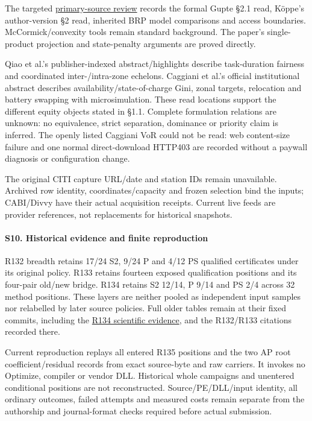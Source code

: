 \documentclass[
  american,
  11pt,
]{article}
\begin{document}
The targeted
\href{https://github.com/yifanXovo/TailoredExact/blob/codex/round172-journal-manuscript/results/unified_exact_round165/literature_review.md}{primary-source
review} records the formal Gupte §2.1 read, Köppe's author-version §2
read, inherited BRP model comparisons and access boundaries.
McCormick/convexity tools remain standard background. The paper's
single-product projection and state-penalty arguments are proved
directly.

Qiao et al.'s publisher-indexed abstract/highlights describe
task-duration fairness and coordinated inter-/intra-zone echelons.
Caggiani et al.'s official institutional abstract describes
availability/state-of-charge Gini, zonal targets, relocation and battery
swapping with microsimulation. These read locations support the
different equity objects stated in §1.1. Complete formulation relations
are unknown: no equivalence, strict separation, dominance or priority
claim is inferred. The openly listed Caggiani VoR could not be read: web
content-size failure and one normal direct-download HTTP403 are recorded
without a paywall diagnosis or configuration change.

The original CITI capture URL/date and station IDs remain unavailable.
Archived row identity, coordinates/capacity and frozen selection bind
the inputs; CABI/Divvy have their actual acquisition receipts. Current
live feeds are provider references, not replacements for historical
snapshots.

\paragraph{S10. Historical evidence and finite
reproduction}\label{s10.-historical-evidence-and-finite-reproduction}

R132 breadth retains 17/24 S2, 9/24 P and 4/12 PS qualified certificates
under its original policy. R133 retains fourteen exposed qualification
positions and its four-pair old/new bridge. R134 retains S2 12/14, P
9/14 and PS 2/4 across 32 method positions. These layers are neither
pooled as independent input samples nor relabelled by later source
policies. Full older tables remain at their fixed commits, including the
\href{https://github.com/yifanXovo/TailoredExact/tree/29adc14cf2089442298b409ba2bc06963e77bc14/results/unified_exact_round134}{R134
scientific evidence}, and the R132/R133 citations recorded there.

Current reproduction replays all entered R135 positions and the two AP
root coefficient/residual records from exact source-byte and raw
carriers. It invokes no Optimize, compiler or vendor DLL. Historical
whole campaigns and unentered conditional positions are not
reconstructed. Source/PE/DLL/input identity, all ordinary outcomes,
failed attempts and measured costs remain separate from the authorship
and journal-format checks required before actual submission.
\end{document}
